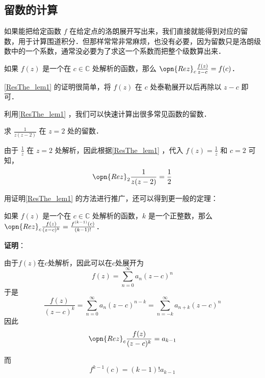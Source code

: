 \subsection{留数的计算}



如果能把给定函数 $f$ 在给定点的洛朗展开写出来，我们直接就能得到对应的留数，用于计算围道积分．但那样常常非常麻烦，也没有必要，因为留数只是洛朗级数中的一个系数，通常没必要为了求这一个系数而把整个级数算出来．

\begin{lemma}{}\label{ResThe_lem1}
如果 $f(z)$ 是一个在 $c\in\mathbb{C}$ 处解析的函数，那么 $\opn{Rez}_c\frac{f(z)}{z-c}=f(c)$．
\end{lemma}

\autoref{ResThe_lem1} 的证明很简单，将 $f(z)$ 在 $c$ 处泰勒展开以后再除以 $z-c$ 即可．

利用\autoref{ResThe_lem1} ，我们可以快速计算出很多常见函数的留数．

\begin{example}{}
求 $\frac{1}{z(z-2)}$ 在 $z=2$ 处的留数．

由于 $\frac{1}{z}$ 在 $z=2$ 处解析，因此根据\autoref{ResThe_lem1} ，代入 $f(z)=\frac{1}{z}$ 和 $c=2$ 可知，
\begin{equation}
\opn{Rez}_2\frac{1}{z(z-2)}=\frac{1}{2}
\end{equation}
\end{example}

用证明\autoref{ResThe_lem1} 的方法进行推广，还可以得到更一般的定理：

\begin{theorem}{}\label{ResThe_the2}
如果 $f(z)$ 是一个在 $c\in\mathbb{C}$ 处解析的函数，$k$ 是一个正整数，那么 $\opn{Rez}_c\frac{f(z)}{(z-c)^k}=\frac{f^{(k-1)}(c)}{(k-1)!}$．
\end{theorem}

\textbf{证明}：

由于$f(z)$在$c$处解析，因此可以在$c$处展开为
\begin{equation}
f(z) = \sum_{n=0}^\infty a_n(z-c)^n
\end{equation}
于是
\begin{equation}
\frac{f(z)}{(z-c)^k} = \sum_{n=0}^\infty a_n(z-c)^{n-k} = \sum_{n=-k}^\infty a_{n+k}(z-c)^n
\end{equation}
因此
\begin{equation}
\opn{Rez}_c\frac{f(z)}{(z-c)^k} = a_{k-1}
\end{equation}

而
\begin{equation}
f^{k-1}(c)=(k-1)!a_{k-1}
\end{equation}

